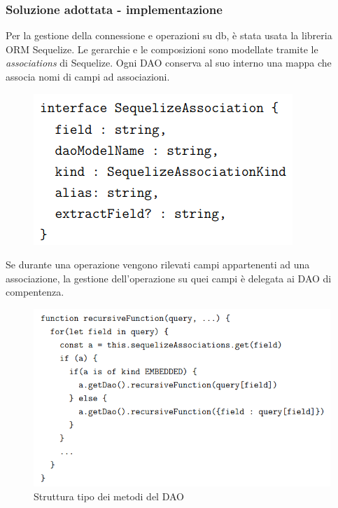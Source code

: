 \documentclass[c]{beamer}
\begin{document}
            \begin{frame}
                \frametitle{Soluzione adottata - implementazione}
                Per la gestione della connessione e operazioni su db, è stata usata la libreria ORM Sequelize.
                \vfill
                Le gerarchie e le composizioni sono modellate tramite le \emph{associations} di Sequelize.
                Ogni DAO conserva al suo interno una mappa che associa nomi di campi ad associazioni.
                \begin{figure}
                    \includegraphics[scale=.5]{Sequelize_assoc.png}
                \end{figure}
            \end{frame}

            \begin{frame}
                Se durante una operazione vengono rilevati campi appartenenti ad una associazione, la gestione dell'operazione su quei campi
                è delegata ai DAO di compentenza.
                \begin{figure}
                    \includegraphics[scale=.5]{Resolution_Example.png}
                    \caption{Struttura tipo dei metodi del DAO}
                \end{figure}
            \end{frame}
    
\end{document}
